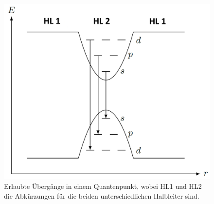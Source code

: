  \begin{figure}[H]
\centering
\includegraphics[scale=0.3]{QP_Energie.PNG}
\caption{Erlaubte Übergänge in einem Quantenpunkt, wobei HL1 und HL2 die Abkürzungen für die beiden unterschiedlichen Halbleiter sind.}
\label{fig:QP_Energien}
\end{figure}
